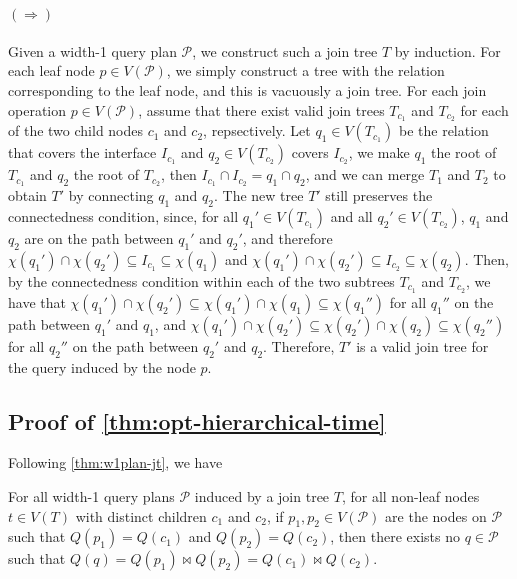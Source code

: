     \paragraph{$(\Rightarrow)$}
    Given a width-1 query plan $\mathcal{P}$, we construct such a join tree $T$ by induction.  
    For each leaf node $p \in V(\mathcal{P})$, we simply construct a tree with the relation corresponding to the leaf node, and this is vacuously a join tree.
    For each join operation $p \in V(\mathcal{P})$,  assume that there exist valid join trees $T_{c_1}$ and $T_{c_2}$ for each of the two child nodes $c_1$ and $c_2$, repsectively.  Let $q_1 \in V(T_{c_1})$ be the relation that covers the interface $I_{c_1}$ and $q_2 \in V(T_{c_2})$ covers $I_{c_2}$, we make $q_1$ the root of $T_{c_1}$ and $q_2$ the root of $T_{c_2}$, then $I_{c_1} \cap I_{c_2} = q_1 \cap q_2$, and we can merge $T_1$ and $T_2$ to obtain $T'$ by connecting $q_1$ and $q_2$.  
    The new tree $T'$ still preserves the connectedness condition, since, for all $q_1' \in V(T_{c_1})$ and all $q_2' \in V(T_{c_2})$, $q_1$ and $q_2$ are on the path between $q_1'$ and $q_2'$, and therefore $\chi(q_1') \cap \chi(q_2') \subseteq I_{c_1} \subseteq \chi(q_1)$ and $\chi(q_1') \cap \chi(q_2') \subseteq I_{c_2} \subseteq \chi(q_2)$. Then, by the connectedness condition within each of the two subtrees $T_{c_1}$ and $T_{c_2}$, we have that $\chi(q_1') \cap \chi(q_2') \subseteq \chi(q_1') \cap \chi(q_1) \subseteq \chi(q_1'')$ for all $q_1''$ on the path between $q_1'$ and $q_1$, and $\chi(q_1') \cap \chi(q_2') \subseteq \chi(q_2') \cap \chi(q_2) \subseteq \chi(q_2'')$ for all $q_2''$ on the path between $q_2'$ and $q_2$.
    Therefore, $T'$ is a valid join tree for the query induced by the node $p$.
    
\subsection{Proof of \cref{thm:opt-hierarchical-time}}

Following \cref{thm:w1plan-jt}, we have

\begin{lemma}
    For all width-1 query plans $\mathcal{P}$ induced by a join tree $T$,
    for all non-leaf nodes $t \in V(T)$ with distinct children $c_1$ and $c_2$,
    if $p_1, p_2 \in V(\mathcal{P})$ are the nodes on $\mathcal{P}$ such that $Q(p_1) = Q(c_1)$ and $Q(p_2) = Q(c_2)$,
    then there exists no $q \in \mathcal{P}$ such that $Q(q) = Q(p_1) \bowtie Q(p_2) = Q(c_1) \bowtie Q(c_2)$.
\end{lemma}

